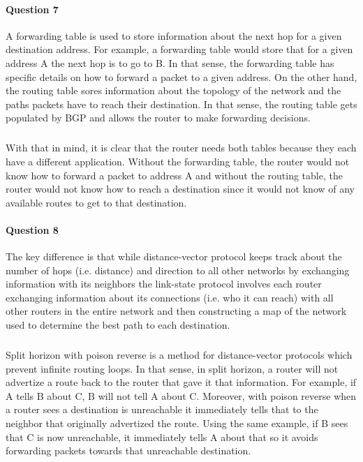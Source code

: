 \documentclass[12pt]{article}
\begin{document}
\pagebreak

\paragraph*{Question 7}
A forwarding table is used to store information about the next hop for a given destination address.
For example, a forwarding table would store that for a given address A the next hop is to go to
B. In that sense, the forwarding table has specific details on how to forward a packet to a given
address. On the other hand, the routing table sores information about the topology of the network and
the paths packets have to reach their destination. In that sense, the routing table gets populated
by BGP and allows the router to make forwarding decisions.

\subparagraph*{}
With that in mind, it is clear that the router needs both tables because they each have a different
application. Without the forwarding table, the router would not know how to forward a packet to
address A and without the routing table, the router would not know how to reach a destination since
it would not know of any available routes to get to that destination.

\paragraph*{Question 8}
The key difference is that while distance-vector protocol keeps track about the number of hops (i.e.
distance) and direction to all other networks by exchanging information with its neighbors the
link-state protocol involves each router exchanging information about its connections (i.e. who
it can reach) with all other routers in the entire network and then constructing a
map of the network used to determine the best path to each destination.

\subparagraph*{}
Split horizon with poison reverse is a method for distance-vector protocols which prevent infinite
routing loops. In that sense, in split horizon, a router will not advertize a route back to the
router that gave it that information. For example, if A tells B about C, B will not tell A about C.
Moreover, with poison reverse when a router sees a destination is unreachable it immediately tells
that to the neighbor that originally advertized the route. Using the same example, if B sees that
C is now unreachable, it immediately tells A about that so it avoids forwarding packets towards
that unreachable destination.
\end{document}
